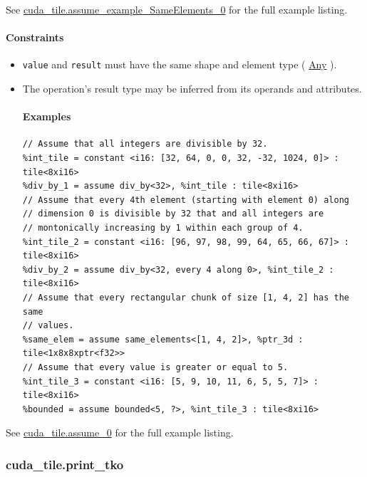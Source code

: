 \documentclass{article}
\begin{document}
See \href{https://docs.nvidia.com/cuda/tile-ir/latest/sections/appendix.html#example-cuda-tile-assume-example-sameelements-0}{cuda\_tile.assume\_example\_SameElements\_0} for the full example listing.



\paragraph{Constraints}

\begin{itemize}
\item \texttt{value} and \texttt{result} must have the same shape and element type ( \href{https://docs.nvidia.com/cuda/tile-ir/latest/sections/operations.html#type-any}{Any} ).
\item The operation's result type may be inferred from its operands and attributes.


\paragraph{Examples}

\begin{lstlisting}
// Assume that all integers are divisible by 32.
%int_tile = constant <i16: [32, 64, 0, 0, 32, -32, 1024, 0]> : tile<8xi16>
%div_by_1 = assume div_by<32>, %int_tile : tile<8xi16>
// Assume that every 4th element (starting with element 0) along
// dimension 0 is divisible by 32 that and all integers are
// montonically increasing by 1 within each group of 4.
%int_tile_2 = constant <i16: [96, 97, 98, 99, 64, 65, 66, 67]> : tile<8xi16>
%div_by_2 = assume div_by<32, every 4 along 0>, %int_tile_2 : tile<8xi16>
// Assume that every rectangular chunk of size [1, 4, 2] has the same
// values.
%same_elem = assume same_elements<[1, 4, 2]>, %ptr_3d : tile<1x8x8xptr<f32>>
// Assume that every value is greater or equal to 5.
%int_tile_3 = constant <i16: [5, 9, 10, 11, 6, 5, 5, 7]> : tile<8xi16>
%bounded = assume bounded<5, ?>, %int_tile_3 : tile<8xi16>
\end{lstlisting}

\end{itemize}
See \href{https://docs.nvidia.com/cuda/tile-ir/latest/sections/appendix.html#example-cuda-tile-assume-0}{cuda\_tile.assume\_0} for the full example listing.



\subsubsection{cuda\_tile.print\_tko}
\end{document}

